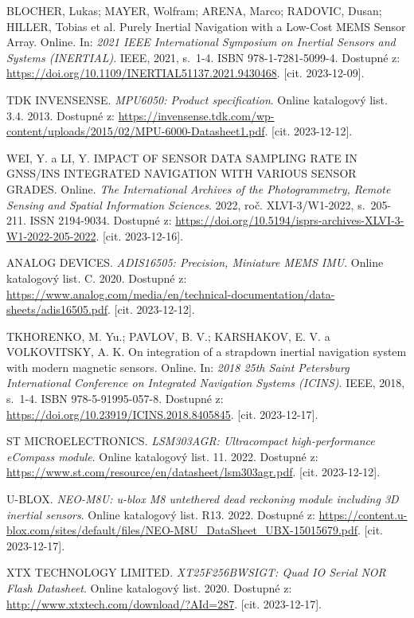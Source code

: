\begin{thebibliography}{99}
BLOCHER, Lukas; MAYER, Wolfram; ARENA, Marco; RADOVIC, Dusan; HILLER, Tobias et al. Purely Inertial Navigation with a Low-Cost MEMS Sensor Array. Online. In: \textit{2021 IEEE International Symposium on Inertial Sensors and Systems (INERTIAL)}. IEEE, 2021, s.~1-4. ISBN 978-1-7281-5099-4. Dostupné z: \url{https://doi.org/10.1109/INERTIAL51137.2021.9430468}. [cit. 2023-12-09].

TDK INVENSENSE. \textit{MPU6050: Product specification}. Online katalogový list. 3.4. 2013. Dostupné z: \url{https://invensense.tdk.com/wp-content/uploads/2015/02/MPU-6000-Datasheet1.pdf}. [cit. 2023-12-12].

WEI, Y. a LI, Y. IMPACT OF SENSOR DATA SAMPLING RATE IN GNSS/INS INTEGRATED NAVIGATION WITH VARIOUS SENSOR GRADES. Online. \textit{The International Archives of the Photogrammetry, Remote Sensing and Spatial Information Sciences}. 2022, roč. XLVI-3/W1-2022, s.~205-211. ISSN 2194-9034. Dostupné z: \url{https://doi.org/10.5194/isprs-archives-XLVI-3-W1-2022-205-2022}. [cit. 2023-12-16].

ANALOG DEVICES. \textit{ADIS16505: Precision, Miniature MEMS IMU}. Online katalogový list. C. 2020. Dostupné z: \url{https://www.analog.com/media/en/technical-documentation/data-sheets/adis16505.pdf}. [cit. 2023-12-12].

TKHORENKO, M. Yu.; PAVLOV, B. V.; KARSHAKOV, E. V. a VOLKOVITSKY, A. K. On integration of a strapdown inertial navigation system with modern magnetic sensors. Online. In: \textit{2018 25th Saint Petersburg International Conference on Integrated Navigation Systems (ICINS)}. IEEE, 2018, s.~1-4. ISBN 978-5-91995-057-8. Dostupné z: \url{https://doi.org/10.23919/ICINS.2018.8405845}. [cit. 2023-12-17].

ST MICROELECTRONICS. \textit{LSM303AGR: Ultracompact high-performance eCompass module}. Online katalogový list. 11. 2022. Dostupné z: \url{https://www.st.com/resource/en/datasheet/lsm303agr.pdf}. [cit. 2023-12-12].

U-BLOX. \textit{NEO-M8U: u-blox M8 untethered dead reckoning module including 3D inertial sensors}. Online katalogový list. R13. 2022. Dostupné z: \url{https://content.u-blox.com/sites/default/files/NEO-M8U\_DataSheet\_UBX-15015679.pdf}. [cit. 2023-12-17].

XTX TECHNOLOGY LIMITED. \textit{XT25F256BWSIGT: Quad IO Serial NOR Flash Datasheet}. Online katalogový list. 2020. Dostupné z: \url{http://www.xtxtech.com/download/?AId=287}. [cit. 2023-12-17].


\end{thebibliography}
